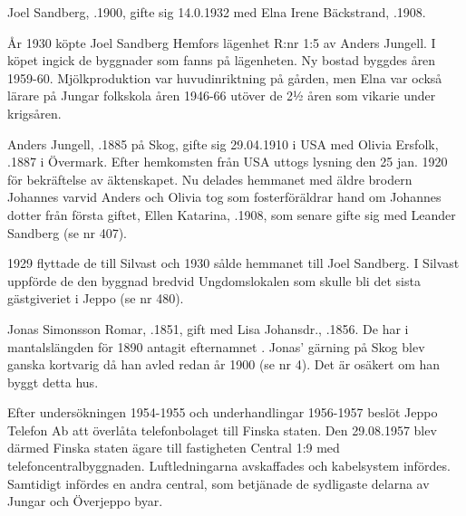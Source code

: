 
Joel Sandberg, .1900, gifte sig 14.0.1932 med Elna Irene Bäckstrand, .1908.

År 1930 köpte Joel Sandberg Hemfors lägenhet R:nr 1:5 av Anders Jungell. I köpet ingick de byggnader som fanns på lägenheten. Ny bostad byggdes åren 1959-60. Mjölkproduktion var huvudinriktning på gården, men Elna var också lärare på Jungar folkskola åren 1946-66 utöver de 2½ åren som vikarie under krigsåren.
\begin{jhchildren}
  \item {}
  \item {}
  \item {}
  \item {}
\end{jhchildren}



Anders Jungell, .1885 på Skog, gifte sig  29.04.1910 i USA med Olivia Ersfolk, .1887 i Övermark. Efter hemkomsten från USA uttogs lysning den 25 jan. 1920 för bekräftelse av äktenskapet. Nu delades hemmanet med äldre brodern Johannes varvid Anders och Olivia tog som fosterföräldrar hand om Johannes dotter från första giftet, Ellen Katarina, .1908, som senare gifte sig med Leander Sandberg (se nr 407).

1929 flyttade de till Silvast och 1930 sålde hemmanet till Joel Sandberg. I Silvast uppförde de den byggnad bredvid Ungdomslokalen som skulle bli det sista gästgiveriet i Jeppo (se nr 480).



Jonas Simonsson Romar, .1851, gift med Lisa Johansdr., .1856. De har i mantalslängden för 1890 antagit efternamnet . Jonas' gärning på Skog blev ganska kortvarig  då han avled redan år 1900 (se nr 4). Det är osäkert om han byggt detta hus.





Efter undersökningen 1954-1955 och underhandlingar 1956-1957 beslöt	Jeppo Telefon Ab att överlåta telefonbolaget till Finska staten. Den 29.08.1957 blev därmed Finska staten ägare till fastigheten Central 1:9 med	telefoncentralbyggnaden. Luftledningarna avskaffades och kabelsystem infördes. Samtidigt infördes en andra central, som betjänade de sydligaste delarna av Jungar och Överjeppo byar.

